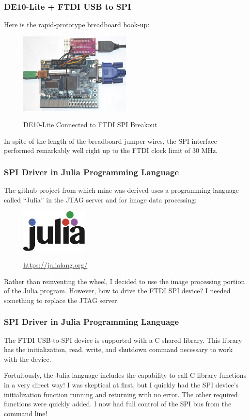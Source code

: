 \documentclass{beamer}
\begin{document}
\begin{frame}
\frametitle{DE10-Lite + FTDI USB to SPI}

Here is the rapid-prototype breadboard hook-up:

\begin{figure}[h]
	\centering
	\includegraphics[width=0.5\textwidth]{graphics/de10_spi}
	\centering\bfseries
	\caption{DE10-Lite Connected to FTDI SPI Breakout}
\end{figure}

In spite of the length of the breadboard jumper wires, the SPI interface performed remarkably well right up to the FTDI clock limit of 30 MHz.

\end{frame}

\begin{frame}
\frametitle{SPI Driver in Julia Programming Language}

The github project from which mine was derived uses a programming language called ``Julia'' in the JTAG server and for image data processing:

\begin{figure}[h]
	\centering
	\includegraphics[width=0.30\textwidth]{graphics/logo}
	\centering\bfseries
	\caption{\url{https://julialang.org/}}
\end{figure}

Rather than reinventing the wheel, I decided to use the image processing portion of the Julia program.
However, how to drive the FTDI SPI device?  I needed something to replace the JTAG server.

\end{frame}

\begin{frame}
\frametitle{SPI Driver in Julia Programming Language}

The FTDI USB-to-SPI device is supported with a C shared library.  This library has the initialization, read, write, and shutdown
command necessary to work with the device.

Fortuitously, the Julia language includes the capability to call C library functions in a very direct way!
I was skeptical at first, but I quickly had the SPI device's initialization function running and returning with no error.
The other required functions were quickly added.  I now had full control of the SPI bus from the command line!

\end{frame}
\end{document}
